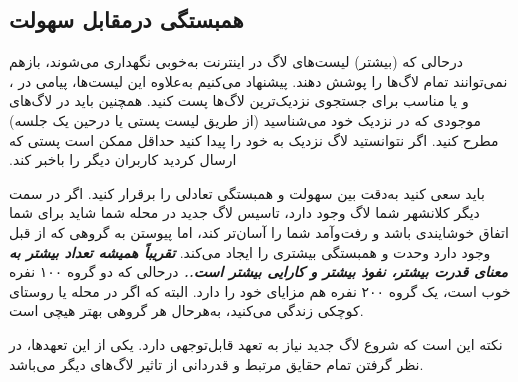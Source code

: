 \subsection{همبستگی درمقابل سهولت}

درحالی که (بیشتر) لیست‌های لاگ در اینترنت  ‫به‌خوبی نگهداری می‌شوند،
بازهم نمی‌توانند تمام لاگ‌ها را پوشش دهند. پیشنهاد می‌کنیم به‌علاوه این لیست‌ها، پیامی در
،
و یا
مناسب برای جستجوی نزدیک‌ترین لاگ‌ها پست کنید.
همچنین باید در لاگ‌های موجودی که در نزدیک خود می‌شناسید
(از طریق لیست پستی یا درحین یک جلسه) مطرح کنید.
اگر نتوانستید لاگ نزدیک به خود را پیدا کنید حداقل ممکن است
پستی که ارسال کردید کاربران دیگر را باخبر کند.


باید سعی کنید به‌دقت بین سهولت و همبستگی تعادلی را برقرار کنید.
اگر در سمت دیگر کلانشهر شما لاگ وجود دارد، تاسیس لاگ جدید
در محله شما شاید برای شما اتفاق خوشایندی باشد و رفت‌وآمد شما را آسان‌تر کند،
اما پیوستن به گروهی که از قبل وجود دارد وحدت و همبستگی بیشتری را ایجاد می‌کند.
{\bfseries {\itshape
تقریباً همیشه تعداد بیشتر به معنای قدرت بیشتر، نفوذ بیشتر و کارایی بیشتر است..
}}
درحالی که دو گروه ۱۰۰ نفره خوب است، یک گروه ۲۰۰ نفره هم مزایای خود را دارد.
البته که اگر در محله یا روستای کوچکی زندگی می‌کنید، به‌هرحال هر گروهی بهتر هیچی است.

نکته این است که شروع لاگ جدید نیاز به تعهد قابل‌توجهی دارد.
یکی از این تعهد‌ها، در نظر گرفتن تمام حقایق مرتبط و قدردانی از تاثیر لاگ‌های
دیگر می‌باشد.
